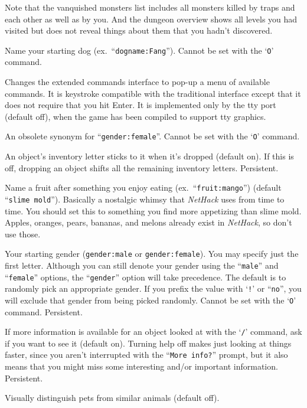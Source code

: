Note that the vanquished monsters list includes all monsters killed by
traps and each other as well as by you. 
And the dungeon overview shows all levels you had visited but does not
reveal things about them that you hadn't discovered.
\item[\ib{dogname}]
Name your starting dog (ex.\ ``{\tt dogname:Fang}'').
Cannot be set with the `{\tt O}' command.
\item[\ib{extmenu}]
Changes the extended commands interface to pop-up a menu of available commands.
It is keystroke compatible with the traditional interface except that it does
not require that you hit Enter.  It is implemented only by the tty port 
(default off), when the game has been compiled to support tty graphics.
\item[\ib{female}]
An obsolete synonym for ``{\tt gender:female}''.  Cannot be set with the
`{\tt O}' command.
\item[\ib{fixinv}]
An object's inventory letter sticks to it when it's dropped (default on).
If this is off, dropping an object shifts all the remaining inventory letters.
Persistent.
\item[\ib{fruit}]
Name a fruit after something you enjoy eating (ex.\ ``{\tt fruit:mango}'')
(default ``{\tt slime mold}''). Basically a nostalgic whimsy that
{\it NetHack\/} uses from time to time.  You should set this to something you
find more appetizing than slime mold.  Apples, oranges, pears, bananas, and
melons already exist in {\it NetHack}, so don't use those.
\item[\ib{gender}]
Your starting gender ({\tt gender:male} or {\tt gender:female}).
You may specify just the first letter.  Although you can
still denote your gender using the ``{\tt male}'' and ``{\tt female}''
options, the ``{\tt gender}'' option will take precedence.
The default is to randomly pick an appropriate gender.
If you prefix the value with `{\tt !}' or ``{\tt no}'', you will
exclude that gender from being picked randomly. 
Cannot be set with the `{\tt O}' command.  Persistent.
\item[\ib{help}]
If more information is available for an object looked at
with the `{\tt /}' command, ask if you want to see it (default on).
Turning help off makes just looking at things faster, since you aren't
interrupted with the ``{\tt More info?}'' prompt, but it also means that you
might miss some interesting and/or important information.  Persistent.
\item[\ib{hilite\verb+_+pet}]
Visually distinguish pets from similar animals (default off).
